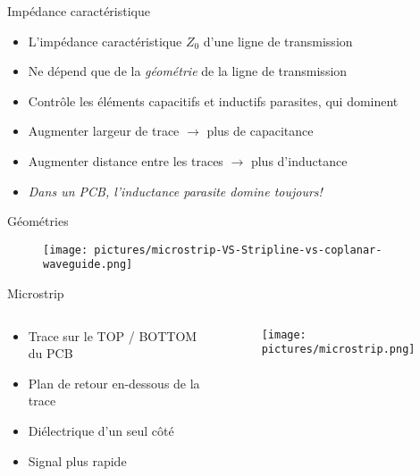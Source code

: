 \begin{frame}{Impédance caractéristique}
    \begin{itemize}
        \item L'impédance caractéristique $Z_0$ d'une ligne de transmission
        \item Ne dépend que de la \textit{géométrie} de la ligne de transmission
        \item Contrôle les éléments capacitifs et inductifs parasites, qui dominent
        \bigskip
        \item Augmenter largeur de trace $\rightarrow$ plus de capacitance
        \item Augmenter distance entre les traces $\rightarrow$ plus d'inductance
        \bigskip
        \item \textit{Dans un PCB, l'inductance parasite domine toujours!}
    \end{itemize}
\end{frame}

\begin{frame}{Géométries}
    \begin{center}
        \begin{figure}
            \centering
            \texttt{[image: pictures/microstrip-VS-Stripline-vs-coplanar-waveguide.png]}
        \end{figure}
    \end{center}
\end{frame}

\begin{frame}{Microstrip}
    \begin{columns}
        \begin{column}{0.66\textwidth}
            \begin{itemize}
                \item Trace sur le TOP / BOTTOM du PCB
                \item Plan de retour en-dessous de la trace
                \item Diélectrique d'un seul côté
                \item Signal plus rapide
            \end{itemize}
        \end{column}
        \begin{column}{0.33\textwidth}
            \begin{center}
                \begin{figure}
                    \centering
                    \texttt{[image: pictures/microstrip.png]}
                \end{figure}
            \end{center}
        \end{column}
    \end{columns}
\end{frame}

